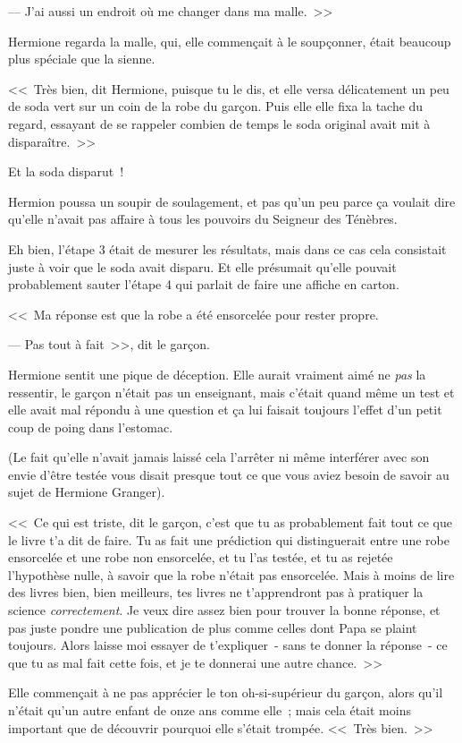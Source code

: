 --- J'ai aussi un endroit où me changer dans ma malle.~>>

Hermione regarda la malle, qui, elle commençait à le soupçonner, était beaucoup plus spéciale que la sienne.

<<~Très bien, dit Hermione, puisque tu le dis, et elle versa délicatement un peu de soda vert sur un coin de la robe du garçon. Puis elle elle fixa la tache du regard, essayant de se rappeler combien de temps le soda original avait mit à disparaître.~>>

Et la soda disparut~!

Hermion poussa un soupir de soulagement, et pas qu'un peu parce ça voulait dire qu'elle n'avait pas affaire à tous les pouvoirs du Seigneur des Ténèbres.

Eh bien, l'étape 3 était de mesurer les résultats, mais dans ce cas cela consistait juste à voir que le soda avait disparu. Et elle présumait qu'elle pouvait probablement sauter l'étape 4 qui parlait de faire une affiche en carton.

<<~Ma réponse est que la robe a été ensorcelée pour rester propre.

--- Pas tout à fait~>>, dit le garçon.

Hermione sentit une pique de déception. Elle aurait vraiment aimé ne \emph{pas} la ressentir, le garçon n'était pas un enseignant, mais c'était quand même un test et elle avait mal répondu à une question et ça lui faisait toujours l'effet d'un petit coup de poing dans l'estomac.

(Le fait qu'elle n'avait jamais laissé cela l'arrêter ni même interférer avec son envie d'être testée vous disait presque tout ce que vous aviez besoin de savoir au sujet de Hermione Granger).

<<~Ce qui est triste, dit le garçon, c'est que tu as probablement fait tout ce que le livre t'a dit de faire. Tu as fait une prédiction qui distinguerait entre une robe ensorcelée et une robe non ensorcelée, et tu l'as testée, et tu as rejetée l'hypothèse nulle, à savoir que la robe n'était pas ensorcelée. Mais à moins de lire des livres bien, bien meilleurs, tes livres ne t'apprendront pas à pratiquer la science \emph{correctement}. Je veux dire assez bien pour trouver la bonne réponse, et pas juste pondre une publication de plus comme celles dont Papa se plaint toujours. Alors laisse moi essayer de t'expliquer~- sans te donner la réponse~- ce que tu as mal fait cette fois, et je te donnerai une autre chance.~>>

Elle commençait à ne pas apprécier le ton oh-si-supérieur du garçon, alors qu'il n'était qu'un autre enfant de onze ans comme elle~; mais cela était moins important que de découvrir pourquoi elle s'était trompée. <<~Très bien.~>>

